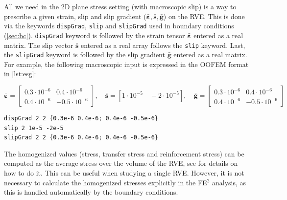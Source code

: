 \documentclass[11pt]{article}
\newcommand{\param}[1]{\texttt{#1}}
\begin{document}
All we need in the 2D plane stress setting (with macroscopic slip) is a way to prescribe a given strain, slip and slip gradient ($\bm{\bar{\varepsilon},\bar{s},\bar{g}}$) on the RVE. This is done via the keywords \param{dispGrad}, \param{slip} and \param{slipGrad} used in boundary conditions (\cref{sec:bc}). \param{dispGrad} keyword is followed by the strain tensor $\bm{\bar{\varepsilon}}$ entered as a real matrix.
The slip vector $\bm{\bar{s}}$ entered as a real array follows the \param{slip} keyword.
Last, the \param{slipGrad} keyword is followed by the slip gradient $\bm{\bar{g}}$ entered as a real matrix. For example, the following macroscopic input is expressed in the OOFEM format in \cref{lst:esg}:

\begin{equation*}
    \bm{\bar{\varepsilon}} = 
    \begin{bmatrix}
        0.3 \cdot  10^{-6} & 0.4 \cdot  10^{-6}\\
        0.4 \cdot  10^{-6} & -0.5 \cdot  10^{-6}
       \end{bmatrix}, \quad 
    \bm{\bar{s}} = \left[ 1 \cdot 10^{-5} \quad -2 \cdot 10^{-5} \right], \quad
    \bm{\bar{g}} = 
    \begin{bmatrix}
        0.3 \cdot  10^{-6} & 0.4 \cdot  10^{-6}\\
        0.4 \cdot  10^{-6} & -0.5 \cdot  10^{-6}
       \end{bmatrix}
\end{equation*}

\begin{lstlisting}[style=oofem,language=oofeminput, label=lst:dispGrad, caption={OOFEM input format for ($\bm{\bar{\varepsilon},\bar{s},\bar{g}}$).}]
dispGrad 2 2 {0.3e-6 0.4e-6; 0.4e-6 -0.5e-6} 
slip 2 1e-5 -2e-5 
slipGrad 2 2 {0.3e-6 0.4e-6; 0.4e-6 -0.5e-6} 
\end{lstlisting}


\noindent The homogenized values (stress, transfer stress and reinforcement stress) can be computed as the average stress over the volume of the RVE, see \cite{PaperB} for details on how to do it. This can be useful when studying a single RVE. However, it is not necessary to calculate the homogenized stresses explicitly in the FE$^2$ analysis, as this is handled automatically by the boundary conditions.
\end{document}
